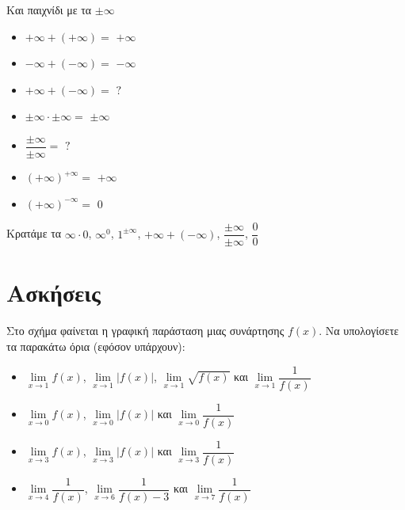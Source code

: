 \documentclass{presentation}
\begin{document}
\begin{frame}{Και παιχνίδι με τα $\pm\infty$}
  \begin{multicols}{2}
    \begin{itemize}
      \item $+\infty + (+\infty)=$ \pause $+\infty$ \pause
      \item $-\infty + (-\infty)=$ \pause $-\infty$ \pause
      \item $+\infty + (-\infty)=$ \pause $?$ \pause
      \item $\pm\infty \cdot \pm\infty=$ \pause $\pm\infty$ \pause
      \item $\dfrac{\pm\infty}{\pm\infty}=$ \pause $?$ \pause
      \item $(+\infty)^{+\infty}=$ \pause $+\infty$ \pause
      \item $(+\infty)^{-\infty}=$ \pause $0$
    \end{itemize}
  \end{multicols}
  Κρατάμε τα $\infty\cdot 0$, $\infty^0$, $1^{\pm\infty}$, $+\infty + (-\infty)$, $\dfrac{\pm\infty}{\pm\infty}$, $\dfrac{0}{0}$
\end{frame}

\section{Ασκήσεις}
\exercises

\begin{askisi}
  Στο σχήμα
  \href{https://www.geogebra.org/m/xzc6usbm}{}
  φαίνεται η γραφική παράσταση μιας συνάρτησης $f(x)$. Να υπολογίσετε τα παρακάτω όρια (εφόσον υπάρχουν):
  \begin{itemize}
    \item $\lim\limits_{x \to 1}{ f(x) }$, $\lim\limits_{x \to 1}{ |f(x)| }$, $\lim\limits_{x \to 1}{ \sqrt{f(x)} }$ και $\lim\limits_{x \to 1}{ \dfrac{1}{f(x)} }$ \pause
    \item $\lim\limits_{x \to 0}{ f(x) }$, $\lim\limits_{x \to 0}{ |f(x)| }$ και $\lim\limits_{x \to 0}{ \dfrac{1}{f(x)} }$ \pause
    \item $\lim\limits_{x \to 3}{ f(x) }$, $\lim\limits_{x \to 3}{ |f(x)| }$ και $\lim\limits_{x \to 3}{ \dfrac{1}{f(x)} }$ \pause
    \item $\lim\limits_{x \to 4}{ \dfrac{1}{f(x)} }$, $\lim\limits_{x \to 6}{ \dfrac{1}{f(x)-3} }$ και $\lim\limits_{x \to 7}{ \dfrac{1}{f(x)} }$
  \end{itemize}
\end{askisi}
\end{document}
